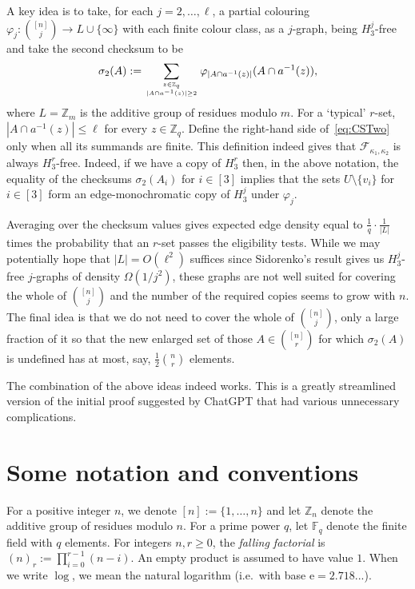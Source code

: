 \documentclass[10pt,a4paper]{article}
\numberwithin{equation}{section}
\theoremstyle{definition}
\theoremstyle{remark}
\newcommand{\Z}[1]{\mathbb Z_{#1}}
\newcommand{\me}{\mathrm{e}}
\newcommand{\CSTwo}{\sigma_2}
\newcommand{\F}[2]{\mathcal F_{#1,#2}}
\newcommand{\PP}{m}
\begin{document}
{A key idea is to take, for each $j=2,\ldots,\ell$, a partial colouring $\varphi_j:\binom{[n]}j\to L\cup\{\infty\}$ with each finite colour class, as a $j$-graph, being $H_3^j$-free and take the second checksum to be
\begin{equation}\label{eq:CSTwo}
\CSTwo(A):=\sum_{z\in\Z{q}\atop 
|A\cap a^{-1}(z)|\ge 2} \varphi_{|A\cap a^{-1}(z)|}(A\cap a^{-1}(z)),
\end{equation}
 where $L=\Z{\PP}$ is the additive group of residues modulo $\PP$. For a `typical' $r$-set, $|A\cap a^{-1}(z)|\le\ell$ for every $z\in\Z{q}$. Define the right-hand side of~\eqref{eq:CSTwo} only when all its summands are finite. This definition indeed gives that $\F{\kappa_1}{\kappa_2}$ is always $H_3^r$-free. Indeed, if we have a copy of $H_3^r$ then, 
 in the above notation,
 the equality of the checksums $\CSTwo(A_i)$ for $i\in [3]$ implies that the sets $U\setminus \{v_i\}$ for $i\in [3]$ form an edge-monochromatic copy of $H_3^j$ under $\varphi_j$.
 
 
Averaging over the checksum values gives expected edge density equal to $\frac1q\cdot\frac1{|L|}$ times the probability that an $r$-set passes the eligibility tests. While we may potentially hope that $|L|=O(\ell^2)$ suffices since Sidorenko's result gives us $H_3^j$-free $j$-graphs of density $\Omega(1/j^2)$, these graphs are not well suited for covering the whole of  $\binom{[n]}j$ and the number of the required copies seems to grow with $n$. The final idea is that we do not need to cover the whole of $\binom{[n]}j$, only a large fraction of it so that the new enlarged set of those $A\in\binom{[n]}r$ for which $\CSTwo(A)$ is undefined has at most, say, $\frac12\binom nr$ elements. 

The combination of the above ideas indeed works. This is a greatly streamlined version of the initial proof suggested by ChatGPT that had various unnecessary complications.
}


\section{Some notation and conventions}\label{sec:notation}

For a positive integer $n$, we denote $[n]:=\{1,\dots,n\}$ and let $\Z{n}$ denote the additive group of residues modulo $n$. For a prime power $q$, let $\mathbb F_q$ denote the finite field with $q$ elements.
For integers $n,r\ge 0$, the \emph{falling factorial} is $(n)_r:=\prod_{i=0}^{r-1}(n-i)$. An empty product is assumed to have value $1$.
When we write $\log$, we mean the natural logarithm (i.e.\ with base $\me=2.718...$).
\end{document}
